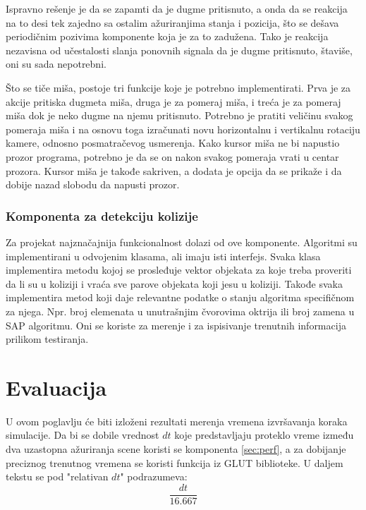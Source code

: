 \documentclass[12pt,oneside]{memoir}
\begin{document}
Ispravno rešenje je da se zapamti da je dugme pritisnuto, a onda da se reakcija na to desi tek zajedno sa ostalim ažuriranjima 
stanja i pozicija, što se dešava periodičnim pozivima komponente koja je za to zadužena. Tako je reakcija nezavisna od učestalosti 
slanja ponovnih signala da je dugme pritisnuto, štaviše, oni su sada nepotrebni. 

Što se tiče miša, postoje tri funkcije koje je potrebno implementirati. Prva je za akcije pritiska 
dugmeta miša, druga je za pomeraj miša, i treća je za pomeraj miša dok je neko dugme na njemu pritisnuto.
Potrebno je pratiti veličinu svakog pomeraja miša i na osnovu toga izračunati novu horizontalnu i vertikalnu rotaciju 
kamere, odnosno posmatračevog usmerenja. Kako kursor miša ne bi napustio prozor programa, potrebno je da se on nakon svakog pomeraja 
vrati u centar prozora. Kursor miša je takođe sakriven, a dodata je opcija da se prikaže i da dobije nazad slobodu da napusti prozor.

\subsection{Komponenta za detekciju kolizije}

Za projekat najznačajnija funkcionalnost dolazi od ove komponente. 
Algoritmi su implementirani u odvojenim klasama, ali imaju isti interfejs.
Svaka klasa implementira metodu kojoj se prosleđuje vektor objekata za koje treba proveriti da li su u koliziji
i vraća sve parove objekata koji jesu u koliziji. Takođe svaka implementira metod koji daje relevantne podatke 
o stanju algoritma specifičnom za njega. Npr. broj elemenata u unutrašnjim čvorovima oktrija ili broj 
zamena u SAP algoritmu. Oni se koriste za merenje i za ispisivanje trenutnih informacija prilikom testiranja.

\chapter{Evaluacija}
\label{sec:evaluacija}

U ovom poglavlju će biti izloženi rezultati merenja vremena izvršavanja koraka simulacije.
Da bi se dobile vrednost $dt$ koje predstavljaju proteklo vreme između dva uzastopna ažuriranja scene
koristi se komponenta \ref{sec:perf}, a za dobijanje preciznog trenutnog vremena se koristi funkcija iz GLUT biblioteke.
U daljem tekstu se pod "relativan $dt$" podrazumeva:
$$ \frac{ dt }{16.667} $$
\end{document}
